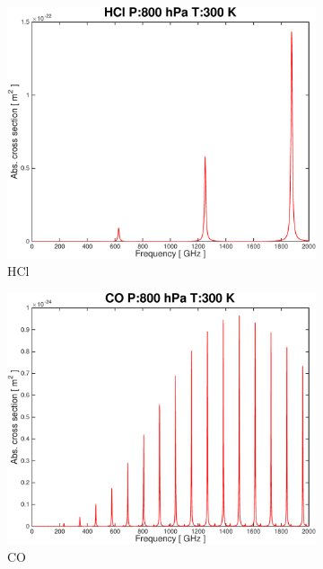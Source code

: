 \documentclass[paper=a4, fontsize=11pt]{scrartcl}
\begin{document}
\begin{figure}[ht]
    \centering
    \begin{subfigure}[t]{0.45\textwidth}
        \includegraphics[width=\textwidth]{plots/plot_xsec_HCl_800hPa_300K.pdf}
        \caption{HCl}
    \end{subfigure}
    \begin{subfigure}[t]{0.45\textwidth}
        \includegraphics[width=\textwidth]{plots/plot_xsec_CO_800hPa_300K.pdf}
        \caption{CO}
    \end{subfigure}
    \begin{subfigure}[b]{0.45\textwidth}

\end{subfigure}
\end{figure}
\end{document}
